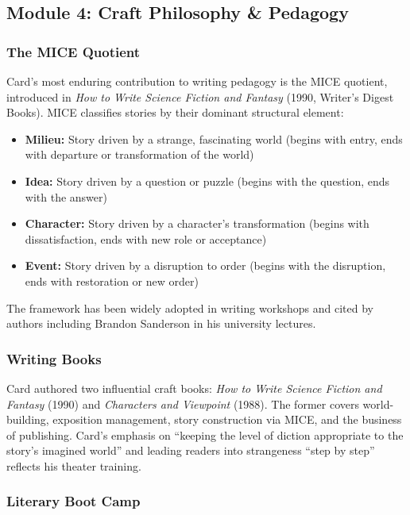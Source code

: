 \documentclass[11pt,letterpaper]{article}
\begin{document}
\subsection{Module 4: Craft Philosophy \& Pedagogy}

\subsubsection{The MICE Quotient}

Card's most enduring contribution to writing pedagogy is the MICE quotient, introduced in \textit{How to Write Science Fiction and Fantasy} (1990, Writer's Digest Books). MICE classifies stories by their dominant structural element:

\begin{itemize}[leftmargin=2em]
  \item \textbf{Milieu:} Story driven by a strange, fascinating world (begins with entry, ends with departure or transformation of the world)
  \item \textbf{Idea:} Story driven by a question or puzzle (begins with the question, ends with the answer)
  \item \textbf{Character:} Story driven by a character's transformation (begins with dissatisfaction, ends with new role or acceptance)
  \item \textbf{Event:} Story driven by a disruption to order (begins with the disruption, ends with restoration or new order)
\end{itemize}

The framework has been widely adopted in writing workshops and cited by authors including Brandon Sanderson in his university lectures.

\subsubsection{Writing Books}

Card authored two influential craft books: \textit{How to Write Science Fiction and Fantasy} (1990) and \textit{Characters and Viewpoint} (1988). The former covers world-building, exposition management, story construction via MICE, and the business of publishing. Card's emphasis on ``keeping the level of diction appropriate to the story's imagined world'' and leading readers into strangeness ``step by step'' reflects his theater training.

\subsubsection{Literary Boot Camp}
\end{document}
